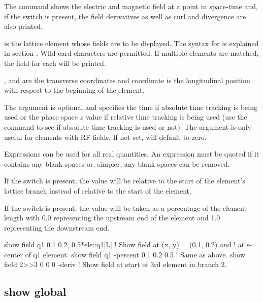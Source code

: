 {{{{{{{{{The  command shows the electric and magnetic field at a point in space-time and, if
the  switch is present, the field derivatives as well as curl and divergence are
also printed.

 is the lattice element whose fields are to be displayed. The syntax for  is
explained in section . Wild card characters are permitted. If multiple
elements are matched, the field for each will be printed.

, and  are the transverse coordinates and  coordinate is the longitudinal
position with respect to the beginning of the element. 

The  argument is optional and specifies the time if absolute time tracking is being
used or the phase space $z$ value if relative time tracking is being used (use the  command to see if absolute time tracking is used or not). The  argument is
only useful for elements with RF fields. If not set,  will default to zero.

Expressions can be used for all real quantities. An expression must be quoted if it contains any
blank spaces or, simpler, any blank spaces can be removed.

If the  switch is present, the  value will be relative to the start
of the element's lattice branch instead of relative to the start of the element.

If the  switch is present, the  value will be taken as a percentage
of the element length with 0.0 representing the upstream end of the element and 1.0 representing
the downstream end.

\begin{example}
  show field q1 0.1  0.2, 0.5*ele::q1[L]  ! Show field at (x, y) = (0.1, 0.2) and 
                                          !    at s-center of q1 element.
  show field q1 -percent 0.1  0.2 0.5 ! Same as above.
  show field 2>>3 0 0 0 -deriv        ! Show field at start of 3rd element in branch 2.
\end{example}


\subsection{show global}
\label{s:show.global}

}}}}}}}}}
